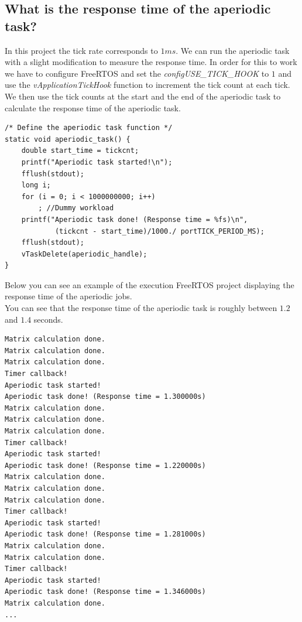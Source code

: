 \documentclass[a4paper]{article}
\begin{document}
\subsection{What is the response time of the aperiodic task?}

In this project the tick rate corresponds to $1ms$. We can run the aperiodic task with a slight modification to measure the response time. In order for this to work we have to configure FreeRTOS and set the \textit{configUSE\_TICK\_HOOK} to $1$ and use the \textit{vApplicationTickHook} function to increment the tick count at each tick. \\
We then use the tick counts at the start and the end of the aperiodic task to calculate the response time of the aperiodic task.\\

\begin{lstlisting}[label=Aperiodic task response time,caption=Calculating response time of aperiodic task]
/* Define the aperiodic task function */
static void aperiodic_task() {
	double start_time = tickcnt;
	printf("Aperiodic task started!\n");
	fflush(stdout);
	long i;
	for (i = 0; i < 1000000000; i++)
		; //Dummy workload
	printf("Aperiodic task done! (Response time = %fs)\n",
			(tickcnt - start_time)/1000./ portTICK_PERIOD_MS);
	fflush(stdout);
	vTaskDelete(aperiodic_handle);
}
\end{lstlisting}

Below you can see an example of the execution FreeRTOS project displaying the response time of the aperiodic jobs.\\
You can see that the response time of the aperiodic task is roughly between $1.2$ and $1.4$ seconds. \\

\begin{lstlisting}[label=Response times of aperiodic tasks,caption=Response time of aperiodic tasks]
Matrix calculation done.
Matrix calculation done.
Matrix calculation done.
Timer callback!
Aperiodic task started!
Aperiodic task done! (Response time = 1.300000s)
Matrix calculation done.
Matrix calculation done.
Matrix calculation done.
Timer callback!
Aperiodic task started!
Aperiodic task done! (Response time = 1.220000s)
Matrix calculation done.
Matrix calculation done.
Matrix calculation done.
Timer callback!
Aperiodic task started!
Aperiodic task done! (Response time = 1.281000s)
Matrix calculation done.
Matrix calculation done.
Timer callback!
Aperiodic task started!
Aperiodic task done! (Response time = 1.346000s)
Matrix calculation done.
...
\end{lstlisting}
\end{document}
